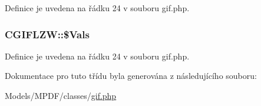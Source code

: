 Definice je uvedena na řádku 24 v souboru gif.\-php.

\hypertarget{class_c_g_i_f_l_z_w_aa878298bf449195f416bf2aa396b99d5}{
\subsubsection[{\$\-Vals}]{\setlength{\rightskip}{0pt plus 5cm}C\-G\-I\-F\-L\-Z\-W\-::\$\-Vals}}\label{class_c_g_i_f_l_z_w_aa878298bf449195f416bf2aa396b99d5}


Definice je uvedena na řádku 24 v souboru gif.\-php.



Dokumentace pro tuto třídu byla generována z následujícího souboru\-:\begin{DoxyCompactItemize}
\item 
Models/\-M\-P\-D\-F/classes/\hyperlink{gif_8php}{gif.\-php}\end{DoxyCompactItemize}
